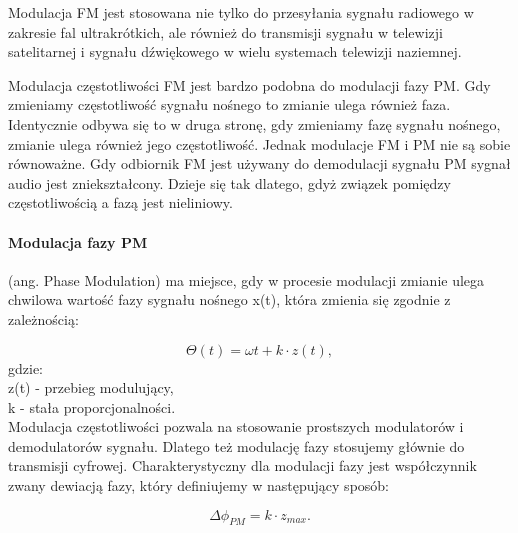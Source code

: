 \documentclass[a4paper,twoside]{report}
\begin{document}
Modulacja FM jest stosowana nie tylko do przesyłania sygnału radiowego w zakresie fal ultrakrótkich, ale również do transmisji sygnału w telewizji satelitarnej i sygnału dźwiękowego w wielu systemach telewizji naziemnej. 

Modulacja częstotliwości FM jest bardzo podobna do modulacji fazy PM. Gdy zmieniamy częstotliwość sygnału nośnego to zmianie ulega również faza. Identycznie odbywa się to w druga stronę, gdy zmieniamy fazę sygnału nośnego, zmianie ulega również jego częstotliwość. Jednak modulacje FM i PM nie są sobie równoważne. Gdy odbiornik FM jest używany do demodulacji sygnału PM sygnał audio jest zniekształcony. Dzieje się tak dlatego, gdyż związek pomiędzy częstotliwością a fazą jest nieliniowy. 

\paragraph{Modulacja fazy PM} (ang. Phase Modulation) ma miejsce, gdy w procesie modulacji zmianie ulega chwilowa wartość fazy sygnału nośnego x(t), która zmienia się zgodnie z zależnością:

\begin{equation}
\Theta (t)=\omega t+k\cdot z(t),
\end{equation}
gdzie: \\
z(t) - przebieg modulujący,\\
k - stała proporcjonalności. \\

Modulacja częstotliwości pozwala na stosowanie prostszych modulatorów i demodulatorów sygnału. Dlatego też modulację fazy stosujemy głównie do transmisji cyfrowej. Charakterystyczny dla modulacji fazy jest współczynnik zwany dewiacją fazy, który definiujemy w następujący sposób:

\begin{equation}
\Delta \phi _{PM}= k\cdot z_{max}.
\end{equation}
\end{document}
